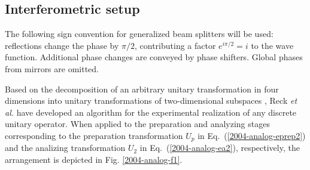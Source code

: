 \documentclass[12pt]{iopart}
\begin{document}
\subsection{Interferometric setup}

The following sign convention for generalized beam splitters will be used:
reflections  change the phase by $\pi /2$, contributing a factor $e^{i\pi /2}=i$
to the wave function.
Additional phase changes are conveyed by phase shifters.
Global phases from mirrors are omitted.

Based on the decomposition of an arbitrary unitary
transformation in four dimensions into unitary transformations
of two-dimensional subspaces \cite{murnaghan}, Reck {\it et al.}  \cite{rzbb}
have developed an algorithm \cite{reck-96} for the experimental realization
of any discrete unitary operator.
When applied to the preparation and analyzing stages corresponding to
the preparation transformation $U_p$ in Eq.~(\ref{2004-analog-eprep2})
and the analizing transformation $U_2$ in Eq.~(\ref{2004-analog-ea2}),
respectively,
the arrangement is depicted in Fig. \ref{2004-analog-f1}.
\end{document}
